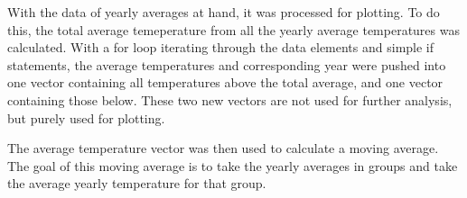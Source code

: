 With the data of yearly averages at hand, it was processed for plotting. To do this, the total average temeperature from all the yearly average temperatures was calculated. With a for loop iterating through the data elements and simple if statements, the average temperatures and corresponding year were pushed into one vector containing all temperatures above the total average, and one vector containing those below. These two new vectors are not used for further analysis, but purely used for plotting.

The average temperature vector was then used to calculate a moving average. The goal of this moving average is to take the yearly averages in groups and take the average yearly temperature for that group.

 




